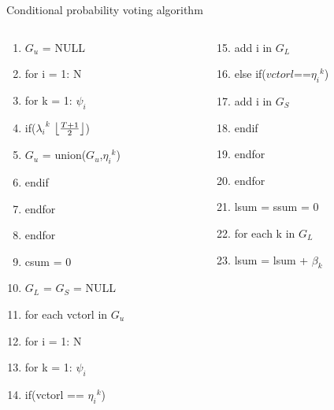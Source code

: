 \documentclass{beamer}
\DeclarePairedDelimiter\floor{\lfloor}{\rfloor}
\begin{document}
\begin{frame}{Conditional probability voting algorithm}
    \begin{block}{}
        \begin{columns}[T] 
            \begin{column}{.34\textwidth}
                \begin{enumerate}
                    \item $G_u$ = NULL
                    \item for i = 1: N
                    \item for k = 1: $\psi_i$
                    \item if(${\lambda_i}^k$ \geq\: $\floor*{\frac{T+1}{2}}$)
                    \item $G_u$ = union($G_u$,${\eta_i}^k$)
                    \item endif
                    \item endfor
                    \item endfor
                    \item csum = 0
                    \item $G_L$ = $G_S$ = NULL
                    \item for each vctorl in $G_u$
                    \item for i = 1: N
                    \item for k = 1: $\psi_i$
                    \item if(vctorl == ${\eta_i}^k$)
                \end{enumerate}
            \end{column}
            \begin{column}{.36\textwidth}
                \begin{enumerate}
                    \setcounter{enumi}{14}
                    \item add i in $G_L$
                    \item else if(\texttildelow$vctorl$==${\eta_i}^k$)
                    \item add i in $G_S$
                    \item endif
                    \item endfor
                    \item endfor
                    \item lsum = ssum = 0
                    \item for each k in $G_L$
                    \item lsum = lsum + $\beta_k$

\end{enumerate}
\end{column}
\end{columns}
\end{block}
\end{frame}
\end{document}
